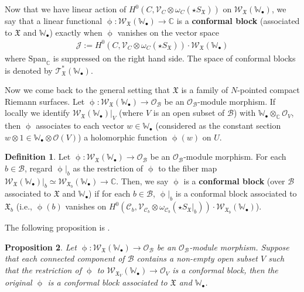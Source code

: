 \documentclass[12pt,a4paper,notitlepage]{article}
\theoremstyle{definition}
\newtheorem{df}{Definition}[section]
\theoremstyle{plain}
\newtheorem{pp}[df]{Proposition}
\newcommand{\fk}{\mathfrak}
\newcommand{\mc}{\mathcal}
\newcommand{\Span}{\mathrm{Span}}
\newcommand{\scr}{\mathscr}
\newcommand{\SX}{{S_{\fk X}}}
\newcommand{\blt}{\bullet}
\newcommand{\Wbb}{\mathbb W}
\newcommand{\Cbb}{\mathbb C}
\numberwithin{equation}{section}
\begin{document}
Now that we have linear action of $H^0(C,\scr V_C\otimes\omega_C(\star\SX))$ on $\scr W_{\fk X}(\Wbb_\blt)$, we say that a linear functional $\upphi:\scr W_{\fk X}(\Wbb_\blt)\rightarrow\Cbb$ is a \textbf{conformal block} (associated to $\fk X$ and $\Wbb_\blt$) exactly when $\upphi$ vanishes on the vector space
\begin{align*}
\scr J:=H^0(C,\scr V_C\otimes\omega_C(\star\SX))\cdot \scr W_{\fk X}(\Wbb_\blt)
\end{align*}
where $\Span_\Cbb$ is suppressed on the right hand side. The space of conformal blocks is denoted by $\scr T^*_{\fk X}(\Wbb_\blt)$.

Now we come back to the general setting that $\fk X$ is a family of $N$-pointed compact Riemann surfaces. Let $\upphi:\scr W_{\fk X}(\Wbb_\blt)\rightarrow\scr O_{\mc B}$ be an $\scr O_{\mc B}$-module morphism. If locally we identify $\scr W_{\fk X}(\Wbb_\blt)|_V$ (where $V$ is an open subset of $\mc B$) with $\Wbb_\blt\otimes_\Cbb\scr O_V$, then $\upphi$ associates to each vector $w\in\Wbb_\blt$ (considered as the constant section $w\otimes 1\in\Wbb_\blt\otimes\scr O(V)$) a holomorphic function $\upphi(w)$ on $U$.


\begin{df}
Let $\upphi:\scr W_{\fk X}(\Wbb_\blt)\rightarrow\scr O_{\mc B}$ be an $\scr O_{\mc B}$-module morphism. For each $b\in\mc B$,  regard $\upphi|_b$ as the restriction of $\upphi$ to the fiber map $\scr W_{\fk X}(\Wbb_\blt)|_{b}\simeq\scr W_{\fk X_b}(\Wbb_\blt)\rightarrow\Cbb$. Then, we say $\upphi$  is  a \textbf{conformal block} (over $\mc B$ associated to $\fk X$ and $\Wbb_\blt$) if for each $b\in\mc B$, $\upphi|_b$ is a  conformal block associated to $\fk X_b$ (i.e., $\upphi(b)$ vanishes on $H^0(\mc C_b,\scr V_{\mc C_b}\otimes\omega_{\mc C_b}(\star\SX|_b))\cdot\scr W_{\fk X_b}(\Wbb_\blt)$).
\end{df}

The following proposition is \cite[Prop. 6.4]{Gui20}.

\begin{pp}\label{lb10}
Let $\upphi:\scr W_{\fk X}(\Wbb_\blt)\rightarrow\scr O_{\mc B}$ be an $\scr O_{\mc B}$-module morphism. Suppose that  each connected component of $\mc B$ contains a non-empty open subset $V$ such that the restriction of $\upphi$ to $\scr W_{\fk X_V}(\Wbb_\blt)\rightarrow\scr O_V$ is a conformal block, then the original $\upphi$ is a conformal block associated to $\fk X$ and $\Wbb_\blt$.
\end{pp}
\end{document}
